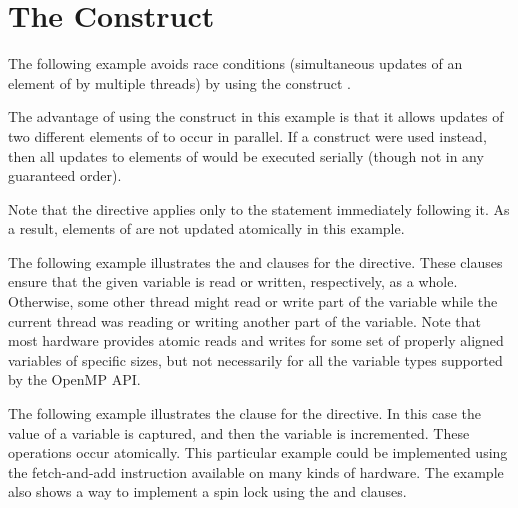 \pagebreak
\chapter{The  Construct}
\label{chap:atomic}

The following example avoids race conditions (simultaneous updates of an element 
of  by multiple threads) by using the  construct .

The advantage of using the  construct in this example is that it 
allows updates of two different elements of  to occur in parallel. If 
a  construct were used instead, then all updates to elements of 
 would be executed serially (though not in any guaranteed order).

Note that the  directive applies only to the statement immediately 
following it. As a result, elements of  are not updated atomically in 
this example.



The following example illustrates the  and   clauses 
for the  directive. These clauses ensure that the given variable 
is read or written, respectively, as a whole. Otherwise, some other thread might 
read or write part of the variable while the current thread was reading or writing 
another part of the variable. Note that most hardware provides atomic reads and 
writes for some set of properly aligned variables of specific sizes, but not necessarily 
for all the variable types supported by the OpenMP API.



The following example illustrates the  clause for the  
directive. In this case the value of a variable is captured, and then the variable 
is incremented. These operations occur atomically. This particular example could 
be implemented using the fetch-and-add instruction available on many kinds of hardware. 
The example also shows a way to implement a spin lock using the  
 and  clauses.




